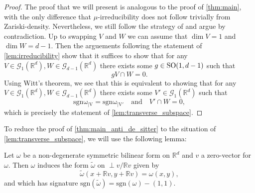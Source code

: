 \documentclass{report}
\begin{document}
\begin{proof}
    The proof that we will present is analogous to the proof of \cref{thm:main}, with the only difference that $\mu$-irreducibility does not follow trivially from Zariski-density.
    Nevertheless, we still follow the strategy of \cite{pozzetti_anosov_2023} and argue by contradiction.
    Up to swapping $V$ and $W$ we can assume that $\dim V = 1$ and $\dim W = d - 1$.
    Then the arguements following the statement of \cref{lem:irreducibility} show that it suffices to show that for any $V \in \mathcal G_1(\mathbb R^d), W \in \mathcal G_{d-1}(\mathbb R^d)$ there exists some $g \in \operatorname{{\mathrm{SO}}}(1,d-1)$ such that
    \[
    g V \cap W = 0.
    \]  
    Using Witt's theorem, we see that this is equivalent to showing that for any $V \in \mathcal G_1(\mathbb R^d), W \in \mathcal G_{d-1}(\mathbb R^d)$ there exists some $V' \in \mathcal G_1(\mathbb R^d)$ such that
    \[
    \mathrm{sgn \omega_{|V}} = \mathrm{sgn \omega_{|V'}} \quad \text{and} \quad V' \cap W = 0,
    \]
    which is precisely the statement of \cref{lem:transverse_subspace}.
\end{proof}

To reduce the proof of \cref{thm:main_anti_de_sitter} to the situation of \cref{lem:transverse_subspace}, we will use the following lemma:
\begin{lemma}\label{lem:induced_form}
    Let $\omega$ be a non-degenerate symmetric bilinear form on $\mathbb R^d$ and $v$ a zero-vector for $\omega$.
    Then $\omega$ induces the form $\tilde{\omega}$ on $\perp v / \mathbb R v$ given by
    \[
    \tilde \omega(x + \mathbb Rv, y + \mathbb Rv) = \omega(x,y),
    \]
    and which has signature $\mathrm{sgn}( \tilde \omega) = \mathrm{sgn}(\omega) - (1,1)$.
\end{lemma}
\end{document}

